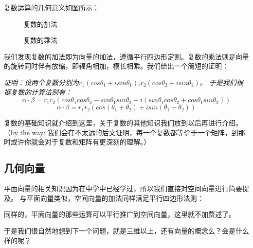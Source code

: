\documentclass[a4paper]{ctexart}
\begin{document}
复数运算的几何意义如图所示：
\begin{figure}[htp]
\centering
{}
\caption{复数的加法}
\end{figure}

\begin{figure}[htp]
\centering
{}
\caption{复数的乘法}
\end{figure}

我们发现复数的加法即为向量的加法，遵循平行四边形定则。复数的乘法则是向量的旋转同时伴有放缩，即辐角相加，模长相乘。我们给出一个简短的证明：

\textit{
证明：设两个复数分别为$r_1(cos\theta_1+isin\theta_1)$,$r_2(cos\theta_2+isin\theta_2)$。
于是我们根据复数的计算法则有：}
$$
\alpha \cdot \beta = r_1 r_2 (cos\theta_1 cos\theta_2 -sin\theta_1 sin\theta_2 +i(sin\theta_1 cos\theta_2 +cos\theta_1 sin\theta_2))
$$
$$
\alpha \cdot \beta = r_1 r_2(cos(\theta_1+\theta_2)+isin(\theta_1+\theta_2))
$$

复数的基础知识就介绍到这里，关于复数的其他知识我们放到以后再进行介绍。（by the way: 我们会在不太远的后文证明，每一个复数都等价于一个矩阵，到那时或许你就会对于复数和矩阵有更深刻的理解。）

\subsection{几何向量}
平面向量的相关知识因为在中学中已经学过，所以我们直接对空间向量进行简要提及。
与平面向量类似，空间向量的加法同样满足平行四边形法则：

同样的，平面向量的那些运算可以平行推广到空间向量，这里就不加赘述了。

于是我们很自然地想到下一个问题，就是三维以上，还有向量的概念么？会是什么样的呢？
\end{document}
